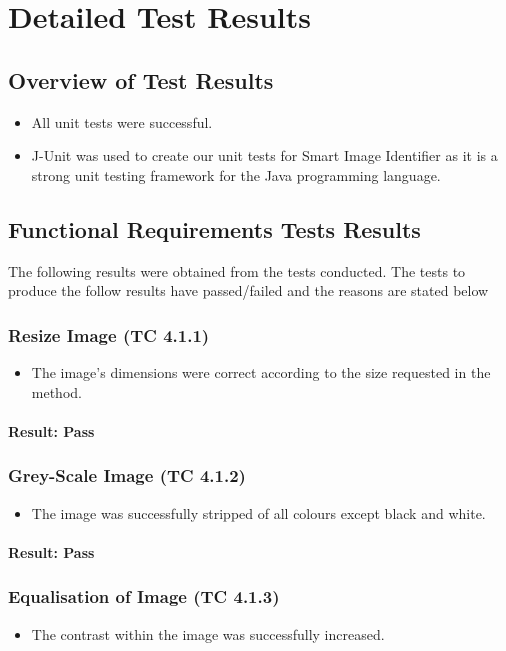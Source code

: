 \documentclass[a4paper,12pt]{report}
\begin{document}
	\section{Detailed Test Results}
	\subsection{Overview of Test Results}
	\begin {itemize}
	\item All unit tests were successful.
	\item J-Unit was used to create our unit tests for Smart Image Identifier as it is a strong unit testing framework for the Java programming language.
	\end {itemize}

	\subsection{Functional Requirements Tests Results}
		The following results were obtained from the tests conducted. The tests to produce the follow results have passed/failed and the reasons are stated below
		\subsubsection{Resize Image (TC 4.1.1)}	
			\begin {itemize}
				\item The image's dimensions were correct according to the size requested in the method.
			\end {itemize}
		\paragraph{Result: Pass}
		
		\subsubsection{Grey-Scale Image (TC 4.1.2)}
		\begin {itemize}
			\item The image was successfully stripped of all colours except black and white.
		\end {itemize}
		\paragraph{Result: Pass}
		
		\subsubsection{Equalisation of Image (TC 4.1.3)}
		\begin {itemize}
			\item The contrast within the image was successfully increased.
		\end {itemize}	
\end{document}
